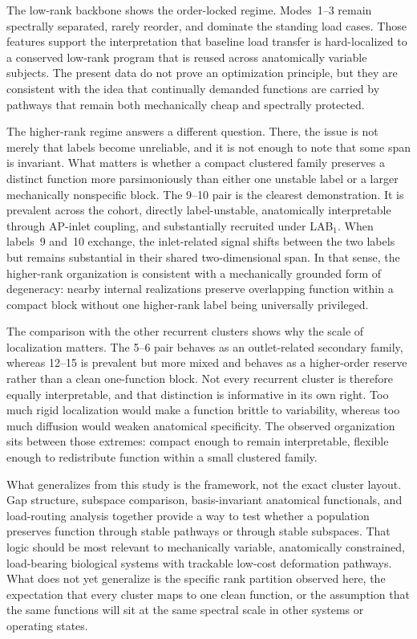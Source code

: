 \documentclass[11pt]{article}
\newcommand{\LABone}{LAB$_1$}
\begin{document}
The low-rank backbone shows the order-locked regime.
Modes~1--3 remain spectrally separated, rarely reorder, and dominate the standing load cases.
Those features support the interpretation that baseline load transfer is hard-localized to a conserved low-rank program that is reused across anatomically variable subjects.
The present data do not prove an optimization principle, but they are consistent with the idea that continually demanded functions are carried by pathways that remain both mechanically cheap and spectrally protected.

The higher-rank regime answers a different question.
There, the issue is not merely that labels become unreliable, and it is not enough to note that some span is invariant.
What matters is whether a compact clustered family preserves a distinct function more parsimoniously than either one unstable label or a larger mechanically nonspecific block.
The 9--10 pair is the clearest demonstration.
It is prevalent across the cohort, directly label-unstable, anatomically interpretable through AP-inlet coupling, and substantially recruited under \LABone.
When labels~9 and~10 exchange, the inlet-related signal shifts between the two labels but remains substantial in their shared two-dimensional span.
In that sense, the higher-rank organization is consistent with a mechanically grounded form of degeneracy: nearby internal realizations preserve overlapping function within a compact block without one higher-rank label being universally privileged.

The comparison with the other recurrent clusters shows why the scale of localization matters.
The 5--6 pair behaves as an outlet-related secondary family, whereas 12--15 is prevalent but more mixed and behaves as a higher-order reserve rather than a clean one-function block.
Not every recurrent cluster is therefore equally interpretable, and that distinction is informative in its own right.
Too much rigid localization would make a function brittle to variability, whereas too much diffusion would weaken anatomical specificity.
The observed organization sits between those extremes: compact enough to remain interpretable, flexible enough to redistribute function within a small clustered family.

What generalizes from this study is the framework, not the exact cluster layout.
Gap structure, subspace comparison, basis-invariant anatomical functionals, and load-routing analysis together provide a way to test whether a population preserves function through stable pathways or through stable subspaces.
That logic should be most relevant to mechanically variable, anatomically constrained, load-bearing biological systems with trackable low-cost deformation pathways.
What does not yet generalize is the specific rank partition observed here, the expectation that every cluster maps to one clean function, or the assumption that the same functions will sit at the same spectral scale in other systems or operating states.
\end{document}
